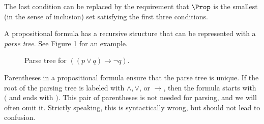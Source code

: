 The last condition can be replaced by the requirement that $\Prop$ is the smallest (in the sense of inclusion) set satisfying the first three conditions.

A propositional formula has a recursive structure that can be represented with a \emph{parse tree}.
See Figure \ref{fig:ParseTreeProp} for an example.

\begin{figure}[ht]
\begin{center}

\end{center}
\caption{Parse tree for $((p \vee q) \to \neg q)$.}
\label{fig:ParseTreeProp}
\end{figure}

Parentheses in a propositional formula ensure that the parse tree is unique.
If the root of the parsing tree is labeled with $\wedge, \vee$, or $\to$, then the formula starts with $($ and ends with $)$.
This pair of parentheses is not needed for parsing, and we will often omit it.
Strictly speaking, this is syntactically wrong, but should not lead to confusion.

